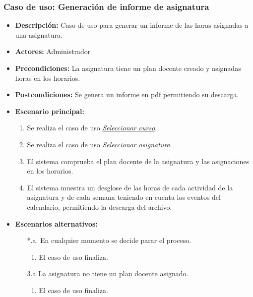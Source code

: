 \documentclass{book}
\begin{document}
\subsubsection*{Caso de uso: Generación de informe de asignatura}
\begin{itemize}
\item{\bf Descripción:} Caso de uso para generar un informe de las horas asignadas a una asignatura.
\item{\bf Actores:} Administrador
\item{\bf Precondiciones:} La asignatura tiene un plan docente creado y asignadas horas en los horarios.
\item{\bf Postcondiciones:} Se genera un informe en pdf permitiendo su descarga.
\item{\bf Escenario principal:}
	\begin{enumerate}
	\item Se realiza el caso de uso {\em \hyperref[select_curso]{Seleccionar curso}}.
	\item Se realiza el caso de uso {\em \hyperref[select_asignatura]{Seleccionar asignatura}}.
	\item El sistema comprueba el plan docente de la asignatura y las asignaciones en los horarios.
	\item El sistema muestra un desglose de las horas de cada actividad de la asignatura y de cada semana teniendo en cuenta los eventos del calendario, permitiendo la descarga del archivo.
	\end{enumerate}
\item{\bf Escenarios alternativos:}
	\begin{itemize}
		\item[*.a.] En cualquier momento se decide parar el proceso.
		\begin{enumerate}
			\item El caso de uso finaliza.
		\end{enumerate}
		\item[3.a] La asignatura no tiene un plan docente asignado.
		\begin{enumerate}
			\item El caso de uso finaliza.
		\end{enumerate}
	\end{itemize}
\end{itemize}
\end{document}
